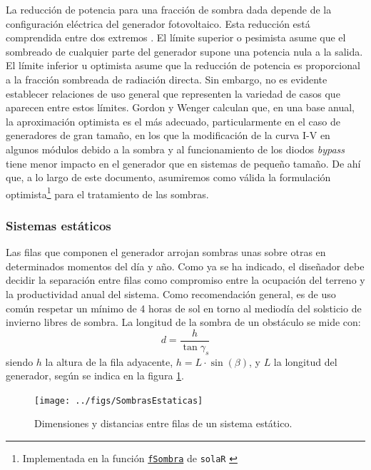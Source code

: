 La reducción de potencia para una fracción de sombra dada depende de
la configuración eléctrica del generador fotovoltaico. Esta reducción
está comprendida entre dos extremos \cite{Gordon.Wenger1991}. 
El límite superior o pesimista asume que el sombreado de cualquier
parte del generador supone una potencia nula a la salida.
El límite inferior u optimista asume que la reducción de potencia es
proporcional a la fracción sombreada de radiación directa. 
Sin embargo, no es evidente establecer relaciones de uso general que representen 
la variedad de casos que aparecen entre estos límites. 
Gordon y Wenger \cite{Gordon.Wenger1991} calculan que, en una base anual,
la aproximación optimista es el más adecuado, particularmente en el
caso de generadores de gran tamaño, en los que la modificación de la
curva I-V en algunos módulos debido a la sombra y al funcionamiento de
los diodos \emph{bypass} tiene menor impacto en el generador que en
sistemas de pequeño tamaño. De ahí que, a lo largo de este documento,
asumiremos como válida la formulación optimista\footnote{Implementada
  en la función
  \href{http://search.r-project.org/R/library/solaR/html/fSombra.html}{\texttt{fSombra}}
  de \texttt{solaR} \cite{Perpinan2012b}} para el tratamiento de
las sombras.

\subsubsection{Sistemas estáticos}

Las filas que componen el generador arrojan sombras unas sobre otras
en determinados momentos del día y año. Como ya se ha indicado, el
diseñador debe decidir la separación entre filas como compromiso entre
la ocupación del terreno y la productividad anual del sistema. Como
recomendación general, es de uso común respetar un mínimo de 4 horas
de sol en torno al mediodía del solsticio de invierno libres de sombra.
La longitud de la sombra de un obstáculo se mide con:
\begin{equation}
d=\frac{h}{\tan\gamma_{s}}
\end{equation}
siendo $h$ la altura de la fila adyacente, $h=L \cdot \sin(\beta)$, y
$L$ la longitud del generador, según se indica en la figura \ref{fig:Sombras-entre-filas}.

%
\begin{figure}
\begin{centering}
\texttt{[image: ../figs/SombrasEstaticas]}
\end{centering}

\caption{Dimensiones y distancias entre filas de un sistema estático.\label{fig:Sombras-entre-filas}}

\end{figure}


